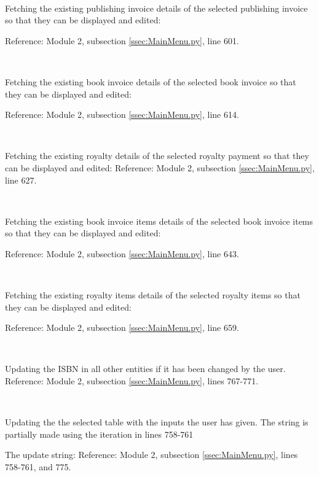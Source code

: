 \

Fetching the existing publishing invoice details of the selected publishing invoice so that they can be displayed and edited:
\begin{tiny}
\end{tiny}
Reference: Module 2,  subsection \ref{ssec:MainMenu.py}, line 601.

\

Fetching the existing book invoice details of the selected book invoice so that they can be displayed and edited:
\begin{tiny}
\end{tiny}
Reference: Module 2,  subsection \ref{ssec:MainMenu.py}, line 614.

\

Fetching the existing royalty details of the selected royalty payment so that they can be displayed and edited:
Reference: Module 2,  subsection \ref{ssec:MainMenu.py}, line 627.

\

Fetching the existing book invoice items details of the selected book invoice items so that they can be displayed and edited:
\begin{tiny}
\end{tiny}
Reference: Module 2,  subsection \ref{ssec:MainMenu.py}, line 643.

\

Fetching the existing royalty items details of the selected royalty items so that they can be displayed and edited:
\begin{tiny}
\end{tiny}
Reference: Module 2,  subsection \ref{ssec:MainMenu.py}, line 659.

\

Updating the ISBN in all other entities if it has been changed by the user.
Reference: Module 2,  subsection \ref{ssec:MainMenu.py}, lines 767-771.

\

Updating the the selected table with the inputs the user has given. The string is partially made using the iteration in lines 758-761
\begin{tiny}
\end{tiny}
The update string:
Reference: Module 2,  subsection \ref{ssec:MainMenu.py}, lines 758-761, and 775.


